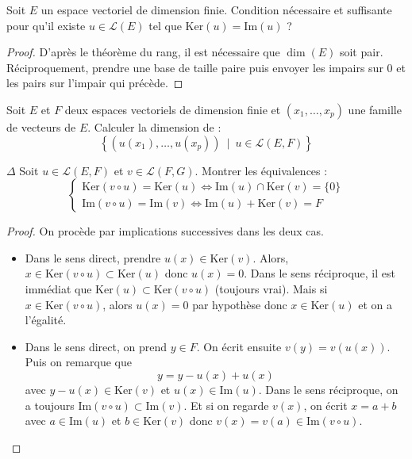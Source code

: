 \documentclass[french,a4paper]{article}
\renewcommand{\ker}{\text{Ker}}
\newcommand{\im}{\text{Im}}
\theoremstyle{plain}
\theoremstyle{definition}
\theoremstyle{remark}
\begin{document}
\begin{ex}[Moulin.EV.33]{}
	Soit $E$ un espace vectoriel de dimension finie. Condition nécessaire et suffisante pour qu'il existe $u\in\mathcal{L}(E)$ tel que $\ker(u)=\im(u)$ ?
\end{ex}
\begin{proof}
	D'après le théorème du rang, il est nécessaire que $\dim(E)$ soit pair. Réciproquement, prendre une base de taille paire puis envoyer les impairs sur $0$ et les pairs sur l'impair qui précède.
\end{proof}

\begin{ex}[Moulin.EV.34]{}
	Soit $E$ et $F$ deux espaces vectoriels de dimension finie et $(x_1,\ldots,x_p)$ une famille de vecteurs de $E$. Calculer la dimension de : $$\left\{(u(x_1),\ldots,u(x_p))\ \mid\ u\in\mathcal{L}(E,F)\right\}$$
\end{ex}

\begin{ex}[Moulin.EV.35]{$\Delta$}
	Soit $u\in\mathcal{L}(E,F)$ et $v\in\mathcal{L}(F,G)$. Montrer les équivalences : $$\begin{cases}
		\ker(v\circ u)=\ker(u)\iff\text{Im}(u)\cap\ker(v)=\{0\} \\
		\text{Im}(v\circ u)=\text{Im}(v)\iff \text{Im}(u)+\ker(v)=F
	\end{cases}$$
\end{ex}
\begin{proof}
	On procède par implications successives dans les deux cas.
	\begin{itemize}
		\item Dans le sens direct, prendre $u(x)\in\ker(v)$. Alors, $x\in\ker(v\circ u)\subset\ker(u)$ donc $u(x)=0$. Dans le sens réciproque, il est immédiat que $\ker(u)\subset\ker(v\circ u)$ (toujours vrai). Mais si $x\in\ker(v\circ u)$, alors $u(x)=0$ par hypothèse donc $x\in\ker(u)$ et on a l'égalité.
		\item Dans le sens direct, on prend $y\in F$. On écrit ensuite $v(y)=v(u(x))$. Puis on remarque que $$y=y-u(x)+u(x)$$ avec $y-u(x)\in\ker(v)$ et $u(x)\in\text{Im}(u)$. Dans le sens réciproque, on a toujours $\text{Im}(v\circ u)\subset\text{Im}(v)$. Et si on regarde $v(x)$, on écrit $x=a+b$ avec $a\in\text{Im}(u)$ et $b\in\ker(v)$ donc $v(x)=v(a)\in\text{Im}(v\circ u)$.
	\end{itemize}
\end{proof}
\end{document}
